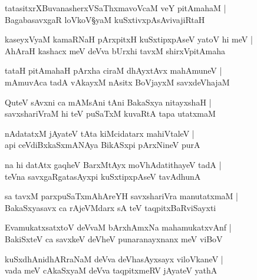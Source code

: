 \begin{shloka}
tatasitxrXBuvanasherxVSaThxmavoVcaM veY pitAmahaM |\\
Bagaba\R savxgaR loVkoV\S yaM kuSxtivxpAsAvivajiRtaH 
\end{shloka}

\begin{shloka}
kaseyxVyaM kamaRNaH pArxpitxH kuSxtipxpAseV yatoV hi meV |\\
AhAraH kashacx meV deVva bUrxhi tavxM shirxVpitAmaha
\end{shloka}

\begin{shloka}
tataH pitAmahaH pArxha ciraM dhAyxtAvx mahAmuneV |\\
mAmuvAca tadA vAkayxM nAsitx BoVjayxM savxdeVhajaM 
\end{shloka}

\begin{shloka}
QuteV sAvxni ca mAMsAni tAni BakaSxya nitayxshaH |\\
savxshariVraM hi teV puSaTxM kuvaRtA tapa utatxmaM 
\end{shloka}

\begin{shloka}
nAdatatxM jAyateV tAta kiMcidatarx mahiVtaleV |\\
api ceVdiBxkaSxmANAya BikASxpi pArxNineV purA
\end{shloka}

\begin{shloka}
na hi datAtx gaqheV BarxMtAyx moVhAdatithayeV tadA |\\
teVna savxgaRgatasAyxpi kuSxtipxpAseV tavAdhunA 
\end{shloka}

\begin{shloka}
sa tavxM parxpuSaTxmAhAreYH savxshariVra manutatxmaM |\\
BakaSxyasavx ca rAjeVMdarx sA teV taqpitxBaRviSayxti 
\end{shloka}

\begin{shloka}
EvamukatxsatxtoV deVvaM bArxhAmxNa mahamukatxvAnf |\\
BakiSxteV ca savxkeV deVheV punaranayxnanx meV viBoV 
\end{shloka}

\begin{shloka}
kuSxdhAnidhARraNaM deVva deVhasAyxsayx viloVkaneV |\\
vada meV cAkaSxyaM deVva taqpitxmeRV jAyateV yathA
\end{shloka}

